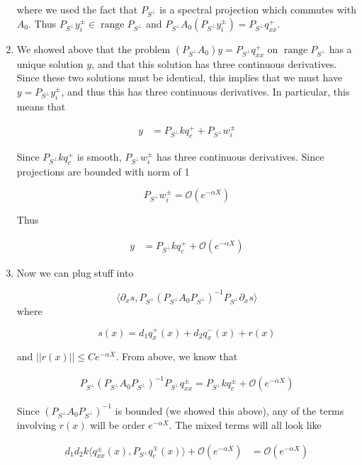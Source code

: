 \documentclass[12pt]{article}
\DeclareMathOperator{\ran}{range}
\begin{document}
\begin{enumerate}
where we used the fact that $P_{S^\perp}$ is a spectral projection which commutes with $A_0$. Thus $P_{S^\perp} y_i^\pm \in \ran P_{S^\perp}$ and $P_{S^\perp} A_0 (P_{S^\perp} y_i^\pm) = P_{S^\perp} q^+_{xx}$. 

\item We showed above that the problem $(P_{S^\perp} A_0) y = P_{S^\perp} q^+_{xx}$ on $\ran P_{S^\perp}$ has a unique solution $y$, and that this solution has three continuous derivatives. Since these two solutions must be identical, this implies that we must have $y = P_{S^\perp} y_i^\pm$, and thus this has three continuous derivatives. In particular, this means that

\begin{align*}
y &= P_{S^\perp} k q^+_c + P_{S^\perp} w_i^\pm
\end{align*}

Since $P_{S^\perp} k q^+_c$ is smooth, $P_{S^\perp} w_i^\pm$ has three continuous derivatives. Since projections are bounded with norm of 1

\[
P_{S^\perp} w_i^\pm = \mathcal{O}(e^{-\alpha X})
\]

Thus

\begin{align*}
y &= P_{S^\perp} k q^+_c + \mathcal{O}(e^{-\alpha X})
\end{align*}

\item Now we can plug stuff into 

\[
\langle \partial_x s, P_{S^\perp} (P_{S^\perp} A_0 P_{S^\perp})^{-1} P_{S^\perp} \partial_x s \rangle
\]
where 

\[
s(x) = d_1 q^+_x(x) + d_2 q^-_x(x) + r(x)
\]

and $||r(x)|| \leq C e^{-\alpha X}$. From above, we know that

\begin{align*}
P_{S^\perp} (P_{S^\perp} A_0 P_{S^\perp})^{-1} P_{S^\perp} q^\pm_{xx} = P_{S^\perp} k q^\pm_c + \mathcal{O}(e^{-\alpha X})
\end{align*}


Since $(P_{S^\perp} A_0 P_{S^\perp})^{-1}$ is bounded (we showed this above), any of the terms involving $r(x)$ will be order $e^{-\alpha X}$. The mixed terms will all look like

\begin{align*}
d_1 d_2 k \langle q^\pm_{xx}(x), P_{S^\perp} q^\mp_c(x) \rangle + \mathcal{O}(e^{-\alpha X})
&= \mathcal{O}(e^{-\alpha X}) 
\end{align*}


\end{enumerate}
\end{document}
